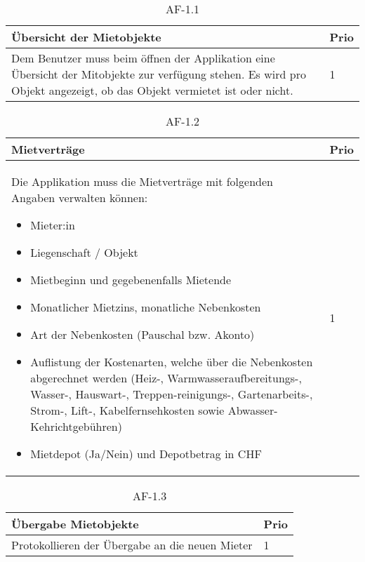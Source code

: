 \begin{table}[ht]
  \centering
  \settowidth{}
  \setlength\extrarowheight{2pt}
  \begin{tabulary}{1.0\textwidth}{|m{16cm}|L|}
    \hline
    \textbf{Übersicht der Mietobjekte}&\textbf{Prio}\\
    \hline
    Dem Benutzer muss beim öffnen der Applikation eine Übersicht der Mitobjekte zur verfügung stehen. Es wird pro Objekt angezeigt, ob das Objekt vermietet ist oder nicht. & 1\\ 
    \hline
  \end{tabulary}
  \caption{AF-1.1}
  \label{af1.1}
\end{table}

\begin{table}[h]
  \centering
  \settowidth{}
  \setlength\extrarowheight{2pt}
  \begin{tabulary}{1.0\textwidth}{|m{16cm}|L|}
    \hline
    \textbf{Mietverträge}&\textbf{Prio}\\
    \hline
    Die Applikation muss die Mietverträge mit folgenden Angaben verwalten können:
    \begin{itemize}
      \item Mieter:in
      \item Liegenschaft / Objekt
      \item Mietbeginn und gegebenenfalls Mietende
      \item Monatlicher Mietzins, monatliche Nebenkosten
      \item Art der Nebenkosten (Pauschal bzw. Akonto)
      \item Auflistung der Kostenarten, welche über die Nebenkosten abgerechnet werden (Heiz-, Warmwasseraufbereitungs-, Wasser-, Hauswart-, Treppen-reinigungs-, Gartenarbeits-, Strom-, Lift-, Kabelfernsehkosten sowie Abwasser- Kehrichtgebühren)
      \item Mietdepot (Ja/Nein) und Depotbetrag in CHF
    \end{itemize}  & 1\\ 
    \hline
  \end{tabulary}
  \caption{AF-1.2}
  \label{af12}
\end{table}

\begin{table}[h]
  \centering
  \settowidth{}
  \setlength\extrarowheight{2pt}
  \begin{tabulary}{1.0\textwidth}{|m{16cm}|L|}
    \hline
    \textbf{Übergabe Mietobjekte}&\textbf{Prio}\\
    \hline
      Protokollieren der Übergabe an die neuen Mieter & 1\\
    \hline
  \end{tabulary}
  \caption{AF-1.3}
  \label{af13}
\end{table}

